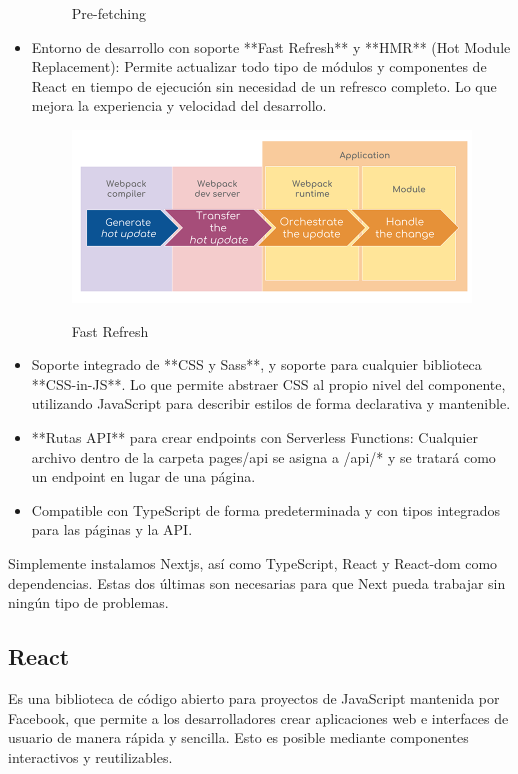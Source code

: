 \documentclass[12pt,twoside,titlepage]{report}
\begin{document}
\begin{itemize}
\begin{figure}[H]
            \caption{Pre-fetching}
        \end{figure}
    \item Entorno de desarrollo con soporte **Fast Refresh** y **HMR** (Hot Module Replacement): Permite actualizar todo tipo de módulos y componentes de React en tiempo de ejecución sin necesidad de un refresco completo. Lo que mejora la experiencia y velocidad del desarrollo.
        \begin{figure}[H]
            \centering
            \includegraphics[scale=0.45]{Nextjs/FastRefresh}
            \label{fig:nextjs_hmr}
            \caption{Fast Refresh}
        \end{figure}    
    \item Soporte integrado de **CSS y Sass**, y soporte para cualquier biblioteca **CSS-in-JS**. Lo que permite abstraer CSS al propio nivel del componente, utilizando JavaScript para describir estilos de forma declarativa y mantenible.
    \item **Rutas API** para crear endpoints con Serverless Functions: Cualquier archivo dentro de la carpeta pages/api se asigna a /api/* y se tratará como un endpoint en lugar de una página.
    \item Compatible con TypeScript de forma predeterminada y con tipos integrados para las páginas y la API.
\end{itemize}

Simplemente instalamos Nextjs, así como TypeScript, React y React-dom como dependencias. Estas dos últimas son necesarias para que Next pueda trabajar sin ningún tipo de problemas.

\subsection{React}

Es una biblioteca de código abierto para proyectos de JavaScript mantenida por Facebook, que permite a los desarrolladores crear aplicaciones web e interfaces de usuario de manera rápida y sencilla. Esto es posible mediante componentes interactivos y reutilizables.
\end{document}
